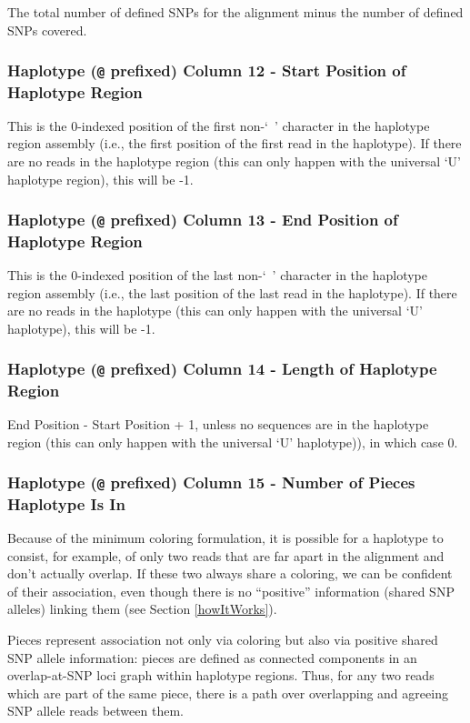 \documentclass[11pt]{llncs}
\begin{document}
The total number of defined SNPs for the alignment minus the number of defined SNPs covered. 


\subsubsection{Haplotype (\texttt{@} prefixed) Column 12 - Start Position of Haplotype Region}

This is the 0-indexed position of the first non-`~' character in the haplotype region assembly (i.e., the first position of the first read in the 
haplotype). If there are no reads in the haplotype region (this can only happen with the universal `U' haplotype region), this will be -1.

\subsubsection{Haplotype (\texttt{@} prefixed) Column 13 - End Position of Haplotype Region}

This is the 0-indexed position of the last non-`~' character in the haplotype region assembly (i.e., the last position of the last read in the haplotype).
If there are no reads in the haplotype (this can only happen with the universal `U' haplotype), this will be -1.

\subsubsection{Haplotype (\texttt{@} prefixed) Column 14 - Length of Haplotype Region}

End Position - Start Position + 1, unless no sequences are in the haplotype region (this can only happen with the universal `U' haplotype)), in which case 0.

\subsubsection{Haplotype (\texttt{@} prefixed) Column 15 - Number of Pieces Haplotype Is In}

Because of the minimum coloring formulation, it is possible for a haplotype to consist, for example, of only two reads that are far apart in the 
alignment and don't actually overlap. If these two always share a coloring, we can be confident of their association, even though there is no 
``positive'' information (shared SNP alleles) linking them (see Section \ref{howItWorks}).

Pieces represent association not only via coloring but also via positive shared SNP allele information: pieces are defined as connected components in 
an overlap-at-SNP loci graph within haplotype regions. Thus, for any two reads which are part of the same piece, there is a path over overlapping and 
agreeing SNP allele reads between them.
\end{document}

